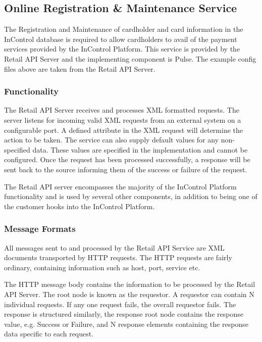 \documentclass[a4paper, 11pt, titlepage]{article}
\begin{document}
\subsection{Online Registration \& Maintenance Service} 
The Registration and Maintenance of cardholder and card information in the InControl database is required to allow cardholders to avail of the payment services provided by the InControl Platform. This service is provided by the Retail API Server and the implementing component is Pulse. The example config files above are taken from the Retail API Server. 
 
\subsubsection{Functionality} 
The Retail API Server receives and processes XML formatted requests. The server listens for incoming valid XML requests from an external system on a configurable port. A defined attribute in the XML request will determine the action to be taken. The service can also supply default values for any non-specified data. These values are specified in the implementation and cannot be configured. 
Once the request has been processed successfully, a response will be sent back to the source informing them of the success or failure of the request. 

The Retail API server encompasses the majority of the InControl Platform functionality and is used by several other components, in addition to being one of the customer hooks into the InControl Platform. 
\subsubsection{Message Formats} 
All messages sent to and processed by the Retail API Service are XML documents transported by HTTP requests. The HTTP requests are fairly ordinary, containing information such as host, port, service etc. 
 
The HTTP message body contains the information to be processed by the Retail API Server. The root node is known as the requestor. A requestor can contain N individual requests. If any one request fails, the overall requestor fails. The response is structured similarly, the response root node contains the response value, e.g. Success or Failure, and N response elements containing the response data specific to each request. 
 
\end{document}
